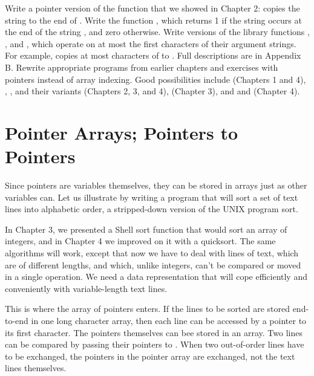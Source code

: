 \begin{ExerciseList}
\Exercise Write a pointer version of the function  that we showed in Chapter 2:  copies the string  to the end of .
\Exercise Write the function , which returns 1 if the string  occurs at the end of the string , and zero otherwise.
\Exercise Write versions of the library functions , , and , which operate on at most the first  characters of their argument strings.
For example,  copies at most  characters of  to . Full descriptions are in Appendix B.
\Exercise Rewrite appropriate programs from earlier chapters and exercises with pointers instead of array indexing.
Good possibilities include  (Chapters 1 and 4), , , and their variants (Chapters 2, 3, and 4),  (Chapter 3), and  and  (Chapter 4).
\end{ExerciseList}



\section{Pointer Arrays; Pointers to Pointers}


Since pointers are variables themselves, they can be stored in arrays just as other variables can.
Let us illustrate by writing a program that will sort a set of text lines into alphabetic order, a stripped-down version of the UNIX program sort.

In Chapter 3, we presented a Shell sort function that would sort an array of integers, and in Chapter 4 we improved on it with a quicksort.
The same algorithms will work, except that now we have to deal with lines of text, which are of different lengths, and which, unlike integers, can't be compared or moved in a single operation.
We need a data representation that will cope efficiently and conveniently with variable-length text lines.

This is where the array of pointers enters.
If the lines to be sorted are stored end-to-end in one long character array, then each line can be accessed by a pointer to its first character.
The pointers themselves can bee stored in an array. Two lines can be compared by passing their pointers to .
When two out-of-order lines have to be exchanged, the pointers in the pointer array are exchanged, not the text lines themselves.

